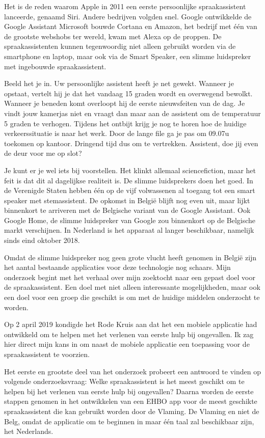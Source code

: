 \documentclass[a0,portrait]{a0poster}
\begin{document}
\begin{multicols}{2}
Het is de reden waarom Apple in 2011 een eerste persoonlijke spraakassistent lanceerde, genaamd Siri. Andere bedrijven volgden snel. Google ontwikkelde de Google Assistant Microsoft bouwde Cortana en Amazon, het bedrijf met één van de grootste webshobs ter wereld, kwam met Alexa op de proppen. De spraakassistenten kunnen tegenwoordig niet alleen gebruikt worden via de smartphone en laptop, maar ook via de Smart Speaker, een slimme luidspreker met ingebouwde spraakassistent.

Beeld het je in. Uw persoonlijke assistent heeft je net gewekt. Wanneer je opstaat, vertelt hij je dat het vandaag 15 graden wordt en overwegend bewolkt. Wanneer je beneden komt overloopt hij de eerste nieuwsfeiten van de dag. Je vindt jouw kamerjas niet en vraagt dan maar aan de assistent om de temperatuur 5 graden te verhogen. Tijdens het ontbijt krijg je nog te horen hoe de huidige verkeerssituatie is naar het werk. Door de lange file ga je pas om 09.07u toekomen op kantoor. Dringend tijd dus om te vertrekken. Assistent, doe jij even de deur voor me op slot?

Je kunt er je wel iets bij voorstellen. Het klinkt allemaal sciencefiction, maar het feit is dat dit al dagelijkse realiteit is. De slimme luidsprekers doen het goed. In de Verenigde Staten hebben één op de vijf volwassenen al toegang tot een smart speaker met stemassistent. De opkomst in België blijft nog even uit, maar lijkt binnenkort te arriveren met de Belgische variant van de Google Assistant. Ook Google Home, de slimme luidspreker van Google zou binnenkort op de Belgische markt verschijnen. In Nederland is het apparaat al langer beschikbaar, namelijk sinds eind oktober 2018.

Omdat de slimme luidspreker nog geen grote vlucht heeft genomen in België zijn het aantal bestaande applicaties voor deze technologie nog schaars. Mijn onderzoek begint met het verhaal over mijn zoektocht naar een gepast doel voor de spraakassistent. Een doel met niet alleen interessante mogelijkheden, maar ook een doel voor een groep die geschikt is om met de huidige middelen onderzocht te worden.

Op 2 april 2019 kondigde het Rode Kruis aan dat het een mobiele applicatie had ontwikkeld om te helpen met het verlenen van eerste hulp bij ongevallen. Ik zag hier direct mijn kans in om naast de mobiele applicatie een toepassing voor de spraakassistent te voorzien.

Het eerste en grootste deel van het onderzoek probeert een antwoord te vinden op volgende onderzoeksvraag: Welke spraakassistent is het meest geschikt om te helpen bij het verlenen van eerste hulp bij ongevallen? Daarna worden de eerste stappen genomen in het ontwikkelen van een EHBO app voor de meest geschikte spraakassistent die kan gebruikt worden door de Vlaming. De Vlaming en niet de Belg, omdat de applicatie om te beginnen in maar één taal zal beschikbaar zijn, het Nederlands.


\end{multicols}
\end{document}
